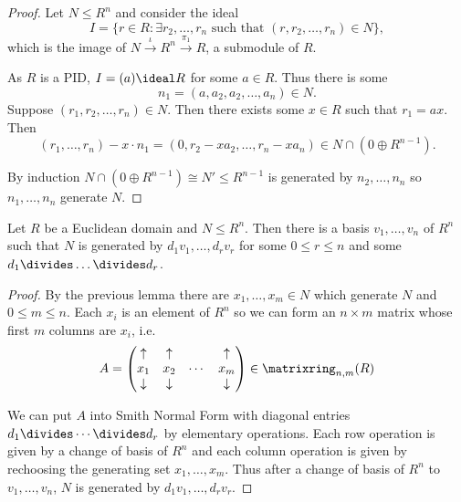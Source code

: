 \documentclass[a4paper]{article}
\theoremstyle{definition}
\begin{document}
\begin{proof}
  Let \(N \leq R^n\) and consider the ideal
  \[
    I = \{r \in R: \exists r_2, \dots, r_n \text{ such that } (r, r_2, \dots, r_n) \in N\},
  \]
  which is the image of \(N \stackrel{\iota}{\to} R^n \stackrel{\pi_1}{\to} R\), a submodule of \(R\).

    As \(R\) is a PID, \(I = (a) \ideal R\) for some \(a \in R\). Thus there is some
    \[
      n_1 = (a, a_2, a_2, \dots, a_n) \in N.
    \]
    Suppose \((r_1, r_2, \dots, r_n) \in N\). Then there exists some \(x \in R\) such that \(r_1 = ax\). Then
    \[
      (r_1, \dots, r_n) - x \cdot n_1 = (0, r_2 - xa_2, \dots, r_n - xa_n) \in N \cap (0 \oplus R^{n-1}).
    \]

    By induction \(N \cap (0 \oplus R^{n - 1}) \cong N' \leq R^{n - 1}\) is generated by \(n_2, \dots, n_n\) so \(n_1, \dots, n_n\) generate \(N\).
\end{proof}

\begin{theorem}
  Let \(R\) be a Euclidean domain and \(N \leq R^n\). Then there is a basis \(v_1, \dots, v_n\) of \(R^n\) such that \(N\) is generated by \(d_1v_1, \dots, d_rv_r\) for some \(0 \leq r \leq n\) and some \(d_1 \divides \dots \divides d_r\).
\end{theorem}

\begin{proof}
  By the previous lemma there are \(x_1, \dots, x_m \in N\) which generate \(N\) and \(0 \leq m \leq n\). Each \(x_i\) is an element of \(R^n\) so we can form an \(n \times m\) matrix whose first \(m\) columns are \(x_i\), i.e.
  \[
    A =
    \begin{pmatrix}
      \uparrow & \uparrow & & \uparrow \\
      x_1 & x_2 & \cdots & x_m \\
      \downarrow & \downarrow & & \downarrow \\
    \end{pmatrix}
    \in \matrixring_{n, m}(R)
  \]

  We can put \(A\) into Smith Normal Form with diagonal entries \(d_1 \divides \cdots \divides d_r\) by elementary operations. Each row operation is given by a change of basis of \(R^n\) and each column operation is given by rechoosing the generating set \(x_1, \dots, x_m\). Thus after a change of basis of \(R^n\) to \(v_1, \dots, v_n\), \(N\) is generated by \(d_1v_1, \dots, d_rv_r\).
\end{proof}
\end{document}
